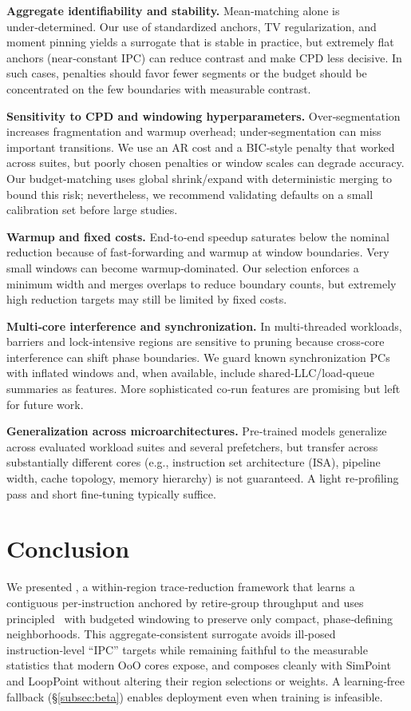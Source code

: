 \textbf{Aggregate identifiability and stability.} Mean‑matching alone is under‑determined. Our use of standardized anchors, TV regularization, and moment pinning yields a surrogate that is stable in practice, but extremely flat anchors (near‑constant IPC) can reduce contrast and make CPD less decisive. In such cases, penalties should favor fewer segments or the budget should be concentrated on the few boundaries with measurable contrast.

\textbf{Sensitivity to CPD and windowing hyperparameters.} Over‑segmentation increases fragmentation and warmup overhead; under‑segmentation can miss important transitions. We use an AR cost and a BIC‑style penalty that worked across suites, but poorly chosen penalties or window scales can degrade accuracy. Our budget‑matching uses global shrink/expand with deterministic merging to bound this risk; nevertheless, we recommend validating defaults on a small calibration set before large studies.

\textbf{Warmup and fixed costs.} End‑to‑end speedup saturates below the nominal reduction because of fast‑forwarding and warmup at window boundaries. Very small windows can become warmup‑dominated. Our selection enforces a minimum width and merges overlaps to reduce boundary counts, but extremely high reduction targets may still be limited by fixed costs.

\textbf{Multi‑core interference and synchronization.} In multi‑threaded workloads, barriers and lock‑intensive regions are sensitive to pruning because cross‑core interference can shift phase boundaries. We guard known synchronization PCs with inflated windows and, when available, include shared‑LLC/load‑queue summaries as features. More sophisticated co‑run features are promising but left for future work.

\textbf{Generalization across microarchitectures.} Pre‑trained models generalize across evaluated workload suites and several prefetchers, but transfer across substantially different cores (e.g., instruction set architecture (ISA), pipeline width, cache topology, memory hierarchy) is not guaranteed. A light re‑profiling pass and short fine‑tuning typically suffice.

\section{Conclusion} \label{summary}
We presented \name, a within‑region trace‑reduction framework that learns a contiguous per‑instruction \pts anchored by retire‑group throughput and uses principled \cpd\ with budgeted windowing to preserve only compact, phase‑defining neighborhoods. This aggregate‑consistent surrogate avoids ill‑posed instruction‑level “IPC” targets while remaining faithful to the measurable statistics that modern OoO cores expose, and composes cleanly with SimPoint and LoopPoint without altering their region selections or weights. A learning‑free fallback (\S\ref{subsec:beta}) enables deployment even when training is infeasible.

